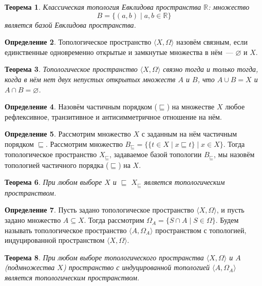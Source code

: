 \documentclass[a4paper,11pt]{article}
\newtheorem{thm}{Теорема}[section]
\theoremstyle{definition}
\newtheorem{dfn}[thm]{Определение}
\begin{document}
\begin{thm}
Классическая топология Евклидова пространства $\mathbb{R}$: множество
\[ B = \{(a, b) \mid a, b \in \mathbb{R}\} \]
является базой Евклидова пространства.
\end{thm}

\begin{dfn}
Топологическое пространство $\langle X, \Omega\rangle$ назовём связным, если
единственные одновременно открытые и замкнутые множества в нём~--- $\varnothing$
и $X$.
\end{dfn}

\begin{thm}
Топологическое пространство $\langle X, \Omega\rangle$ связно тогда и только
тогда, когда в нём нет двух непустых открытых множеств $A$ и $B$, что
$A \cup B = X$ и $A \cap B = \varnothing$.
\end{thm}

\begin{dfn}
Назовём частичным порядком ($\sqsubseteq$) на множестве $X$ любое рефлексивное,
транзитивное и антисимметричное отношение на нём.
\end{dfn}

\begin{dfn}
Рассмотрим множество $X$ с заданным на нём частичным порядком $\sqsubseteq$.
Рассмотрим множество
$B_\sqsubseteq = \{\{t \in X \mid x \sqsubseteq t\} \mid x \in X\}$. Тогда
топологическое пространство $X_\sqsubseteq$, задаваемое базой топологии
$B_\sqsubseteq$, мы назовём топологией частичного порядка ($\sqsubseteq$) на $X$.
\end{dfn}

\begin{thm}
При любом выборе $X$ и $\sqsubseteq$ $X_\sqsubseteq$ является топологическим
пространством.
\end{thm}

\begin{dfn}
Пусть задано топологическое пространство $\langle X, \Omega\rangle$, и пусть
задано множество $A \subseteq X$. Тогда рассмотрим
$\Omega_A = \{S \cap A \mid S \in \Omega\}$. Будем называть топологическое
пространство $\langle A, \Omega_A\rangle$ пространством с топологией,
индуцированной пространством $\langle X, \Omega\rangle$.
\end{dfn}

\begin{thm}
При любом выборе топологического пространства $\langle X, \Omega\rangle$ и $A$
(подмножества $X$) пространство с индуцированной топологией
$\langle A, \Omega_A\rangle$ является топологическим пространством.
\end{thm}
\end{document}
